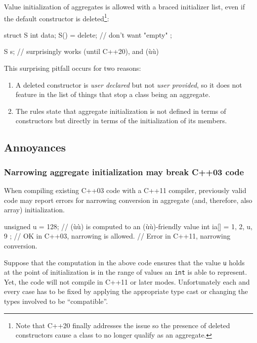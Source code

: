 Value initialization of aggregates is allowed with a braced initializer
list, even if the default constructor is deleted{\cprotect\footnote{Note
that C++20 finally addresses the issue so the presence of deleted
  constructors cause a class to no longer qualify as an aggregate.}}:

\begin{emcppslisting}
struct S
{
    int data;
    S() = delete; // don't want "empty"
};

S s{}; // surprisingly works (until C++20), and (ù{}ù)
\end{emcppslisting}
    
\noindent This surprising pitfall occurs for two reasons:
\begin{enumerate}
\item{A deleted constructor is \emph{user declared} but not \emph{user provided}, so it does not feature in the list of things that stop a class being an aggregate.}
\item{The rules state that aggregate initialization is not defined in terms of constructors but directly in terms of the initialization of its members.}
\end{enumerate}

\subsection[Annoyances]{Annoyances}\label{annoyances}

\subsubsection[Narrowing aggregate initialization may break C++03 code]{Narrowing aggregate initialization may break C++03 code}\label{narrowing-aggregate-initialization-may-break-c++03-code}

When compiling existing C++03 code with a C++11 compiler, previously
valid code may report errors for narrowing conversion in aggregate (and,
therefore, also array) initialization.

\begin{emcppslisting}
unsigned u = 128;           // (ù{}ù) is computed to an (ù{}ù)-friendly value
int ia[] = { 1, 2, u, 9 };  // OK in C++03, narrowing is allowed.
                            // Error in C++11, narrowing conversion.
\end{emcppslisting}
    

\noindent Suppose that the computation in the above code ensures that the value
\lstinline!u! holds at the point of initialization is in the range of
values an \lstinline!int! is able to represent. Yet, the code will not
compile in C++11 or later modes. Unfortunately each and every case has
to be fixed by applying the appropriate type cast or changing the types
involved to be ``compatible''.

